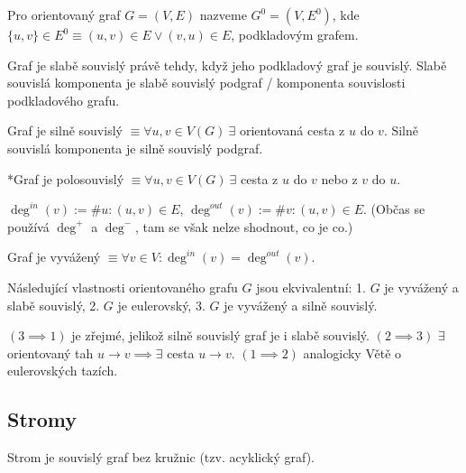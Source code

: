 \documentclass[12pt]{article}					%
\begin{document}
        \begin{definice}
            Pro orientovaný graf $G=(V, E)$ nazveme $G^0 = (V, E^0)$, kde $\{u, v\} \in E^0 ≡ (u, v) \in E \lor (v, u) \in E$, podkladovým grafem.

            Graf je slabě souvislý právě tehdy, když jeho podkladový graf je souvislý. Slabě souvislá komponenta je slabě souvislý podgraf / komponenta souvislosti podkladového grafu.

            Graf je silně souvislý $≡ \forall u, v \in V(G)\ \exists$ orientovaná cesta z $u$ do $v$. Silně souvislá komponenta je silně souvislý podgraf.

            *Graf je polosouvislý $≡ \forall u, v \in V(G)\ \exists$ cesta z $u$ do $v$ nebo z $v$ do $u$.
        \end{definice}

        \begin{definice}[Stupně]
                $\deg^{in}(v) := \#u: (u, v) \in E$, $\deg^{out}(v) := \#v: (u, v) \in E$. (Občas se používá $\deg^+$ a $\deg^-$, tam se však nelze shodnout, co je co.)
        \end{definice}

        \begin{definice}
            Graf je vyvážený $≡ \forall v \in V: \deg^{in}(v) = \deg^{out}(v)$.
        \end{definice}

        \begin{veta}
            Následující vlastnosti orientovaného grafu $G$ jsou ekvivalentní: 1. $G$ je vyvážený a slabě souvislý, 2. $G$ je eulerovský, 3. $G$ je vyvážený a silně souvislý.
            \begin{dukazin}
                $(3\implies 1)$ je zřejmé, jelikož silně souvislý graf je i slabě souvislý. $(2 \implies 3)$ $\exists$ orientovaný tah $u\rightarrow v \implies \exists$ cesta $u \rightarrow v$. $(1 \implies 2)$ analogicky Větě o eulerovských tazích. 
            \end{dukazin}
        \end{veta}

    \subsection{Stromy}
        \begin{definice}[Strom]
            Strom je souvislý graf bez kružnic (tzv. acyklický graf).
        \end{definice}
\end{document}
